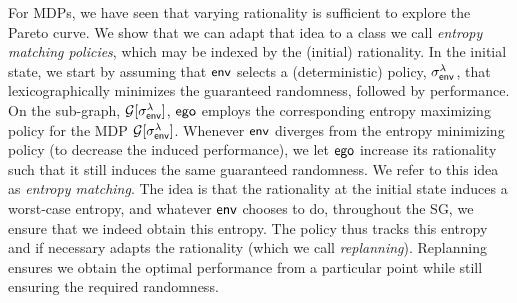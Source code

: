 For MDPs, we have seen that varying rationality is sufficient to explore the Pareto curve. 
We show that we can adapt that idea to a class we call \emph{entropy matching policies}, which may be indexed by the (initial) rationality. 
In the initial state, we start by assuming that $\mathsf{env}$
selects a (deterministic) policy, $\sigma^\lambda_{\mathsf{env}}$, that
lexicographically minimizes the guaranteed randomness, followed by
performance. On the sub-graph, $\mathcal{G}[\sigma^\lambda_{\mathsf{env}}]$, $\mathsf{ego}$
employs the corresponding entropy maximizing policy for the MDP $\mathcal{G}[\sigma^\lambda_{\mathsf{env}}]$. 
Whenever $\mathsf{env}$ diverges from the entropy minimizing policy (to decrease the induced performance), we let $\mathsf{ego}$ increase its rationality such that it still induces the same guaranteed randomness.  We refer to this idea as \emph{entropy matching}. The idea is that the rationality at the initial state induces a worst-case entropy, and whatever $\mathsf{env}$ chooses to do, throughout the SG, we ensure that we indeed obtain this entropy. 
The policy thus tracks this entropy and if necessary adapts the rationality (which we call \emph{replanning}). 
Replanning ensures we obtain the optimal performance from a particular point while still ensuring the required randomness.

